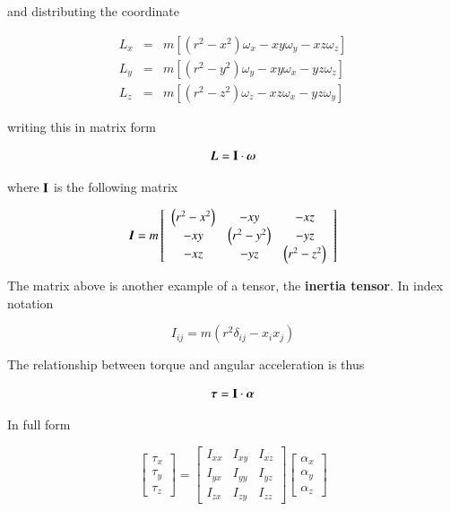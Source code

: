 and distributing the coordinate  

\begin{eqnarray}
L_x &=& m \left[\left(r^2-x^2\right)\omega_x -  xy\omega_y - xz\omega_z\right]\\
L_y &=& m \left[\left(r^2-y^2\right)\omega_y -  xy\omega_x - yz\omega_z\right]\\
L_z &=& m \left[\left(r^2-z^2\right)\omega_z -  xz\omega_x - yz\omega_y\right]
\end{eqnarray}


writing this in matrix form

\begin{equation}
{\boldsymbol{L}}= \boldsymbol{\mathrm{I}} \cdot {\boldsymbol{\omega}}
\end{equation}


where $\boldsymbol{\mathrm{I}}$ is the following matrix

\begin{equation}
{\boldsymbol{I}} = m\left[\begin{array}{ccc}
 \left(r^2-x^2\right) &-  xy &- xz \\
 -  xy & \left(r^2-y^2\right) & - yz \\
 -  xz &- yz & \left(r^2-z^2\right)
\end{array}\right]
\end{equation}


The matrix above is another example of a tensor, the {\bf inertia tensor}. In index notation 

\begin{equation}
I_{ij} = m (r^2 \delta_{ij} - x_ix_j)
\end{equation}


The relationship between torque and angular acceleration is thus 

\begin{equation}
{\boldsymbol{\tau}} = \boldsymbol{\mathrm{I}}\cdot{\boldsymbol{\alpha}}
\end{equation}


In full form 

\begin{equation}
\left[\begin{array}{c}
\tau_x\\
\tau_y\\
\tau_z
\end{array}\right] = \left[\begin{array}{ccc}
I_{xx} & I_{xy} & I_{xz} \\
I_{yx} & I_{yy} & I_{yz} \\
I_{zx} & I_{zy} & I_{zz}
\end{array}\right] 
\left[\begin{array}{c}
\alpha_x\\
\alpha_y\\
\alpha_z
\end{array}\right] 
\end{equation}


